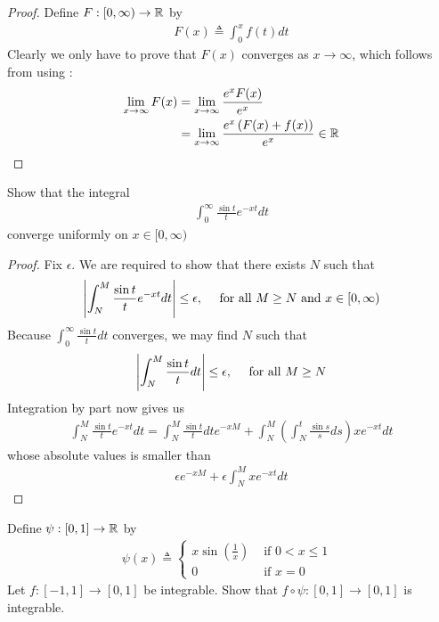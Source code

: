 \documentclass{report}
\begin{document}
\begin{proof}
Define $F:[0,\infty)\rightarrow \mathbb{R}$ by 
\begin{align*}
F(x)\triangleq \int_0^x f(t)dt 
\end{align*}
Clearly we only have to prove that $F(x)$ converges as $x \rightarrow  \infty$, which follows from using : 
\begin{align*}
\lim_{x\to \infty} F(x)&= \lim_{x\to \infty} \frac{e^xF(x)}{e^x}  \\
&=\lim_{x\to \infty} \frac{e^x \left(F(x)+f(x) \right)}{e^x} \in\mathbb{R}
\end{align*}
\end{proof}
\begin{question}{}{}
Show that the integral 
\begin{align*}
\int_0^\infty \frac{\sin t}{t}e^{-xt}dt
\end{align*}
converge uniformly on $x \in [0,\infty)$
\end{question}
\begin{proof}
Fix $\epsilon $. We are required to show that there exists $N$ such that 
\begin{align*}
  \left|\int_N^{M} \frac{\sin t}{t}e^{-xt} dt\right| \leq \epsilon ,\quad \text{ for all }M\geq N \text{ and }x \in [0,\infty)
\end{align*}
Because $\int_0^{\infty} \frac{\sin t}{t}dt$ converges, we may find $N$ such that  
 \begin{align*}
\left|\int_N^M \frac{\sin t}{t}dt\right|\leq \epsilon ,\quad \text{ for all }M\geq N
\end{align*}
Integration by part now gives us 
\begin{align*}
\int_N^M \frac{\sin t}{t}e^{-xt}dt = \int_N^M \frac{\sin t}{t}dt e^{-xM}+  \int_N^M \left(\int_N^t \frac{\sin s}{s}ds\right)xe^{-xt}dt
\end{align*}
whose absolute values is smaller than 
\begin{align*}
\epsilon  e^{-xM} +  \epsilon  \int_N^M xe^{-xt}dt
\end{align*}
\end{proof}
\begin{question}{}{}
  Define $\psi: [0,1]\rightarrow \mathbb{R}$ by \begin{align*} \psi (x)\triangleq \begin{cases} x \sin \left(\frac{1}{x} \right)& \text{ if $0<x\leq 1$ }\\ 0& \text{ if $x=0$ } \end{cases} \end{align*} Let $f:[-1,1]\rightarrow [0,1]$ be integrable. Show that $f \circ \psi : [0,1]\rightarrow [0,1]$ is integrable. 
\end{question}
\end{document}
